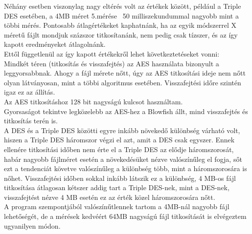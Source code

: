 \noindent Néhány esetben viszonylag nagy eltérés volt az értékek között, például a Triple DES esetében, a 4MB méret 5.mérése ~50 milliszekundummal nagyobb mint a többi mérés. Pontosabb átlagértékeket kaphatnánk, ha az egyik módszerrel X méretű fájlt mondjuk százszor titkosítanánk, nem pedig csak tízszer, és az így kapott eredményeket átlagolnánk.
\vspace{5pt}\\Ettől függetlenül az így kapott értékekről lehet következtetéseket vonni:
\vspace{5pt}\\Mindkét téren (titkosítás és visszafejtés) az AES használata bizonyult a leggyorsabbnak. Ahogy a fájl mérete nőtt, úgy az AES titkosítási ideje nem nőtt olyan látványosan, mint a többi algoritmus esetében. Visszafejtési időre szintén igaz ez az állítás. 
\\Az AES titkosításhoz 128 bit nagyságú kulcsot használtam.
\vspace{5pt}\\Gyorsaságot tekintve legközelebb az AES-hez a Blowfish állt, mind visszafejtés és titkosítás terén is.
\vspace{5pt}\\A DES és a Triple DES közötti egyre inkább növekedő különbség várható volt, hiszen a Triple DES háromszor végzi el azt, amit a DES csak egyszer. Ennek ellenére titkosítási időben nem érte el a Triple DES az elődje háromszorosát, habár nagyobb fájlméret esetén a növekedésüket nézve valószínűleg el fogja, sőt ezt a tendenciát követve valószínűleg a különbség több, mint a háromszorosára is nőhet. Visszafejtési időben sokkal inkább látszik ez a különbség, 4 MB-os fájl titkosítása átlagosan kétszer addig tart a Triple DES-nek, mint a DES-nek, visszafejtést nézve 4 MB esetén ez az érték közel háromszorosára nőtt.
\vspace{5pt}\\A program szempontjából valószínűtlennek tartom a 4MB-nál nagyobb fájl lehetőségét, de a mérések kedvéért 64MB nagyságú fájl titkosítását is elvégeztem ugyanilyen módon. 


